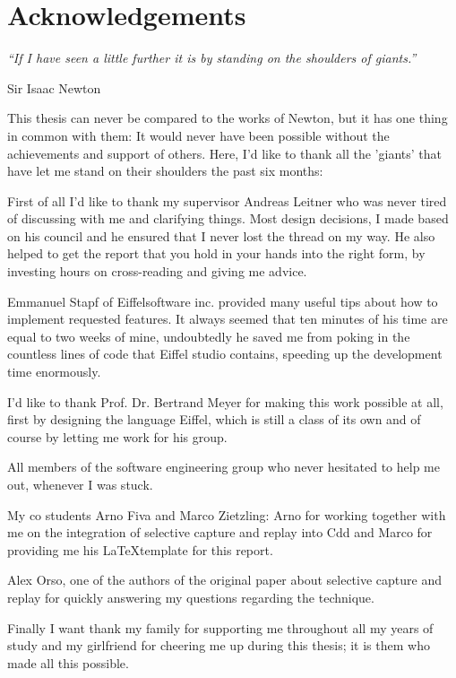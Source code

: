 \chapter*{Acknowledgements}
\begin{center}
 \textit{``If I have seen a little further it is by standing on the shoulders of giants.''}
\end{center}
\begin{flushright}
 Sir Isaac Newton
\end{flushright}

This thesis can never be compared to the works of Newton, but it has one thing in common with them: It would never have been possible without the achievements and support of others. Here, I'd like to thank all the 'giants' that have let me stand on their shoulders the past six months:

First of all I'd like to thank my supervisor Andreas Leitner who was never tired of discussing with me and clarifying things. Most design decisions, I made based on his council and he ensured that I never lost the thread on my way. He also helped to get the report that you hold in your hands into the right form, by investing hours on cross-reading and giving me advice.

Emmanuel Stapf of Eiffelsoftware inc. provided many useful tips about how to implement requested features. It always seemed that ten minutes of his time are equal to two weeks of mine, undoubtedly he saved me from poking in the countless lines of code that Eiffel studio contains, speeding up the development time enormously.

I'd like to thank Prof. Dr. Bertrand Meyer for making this work possible at all, first by designing the language Eiffel, which is still a class of its own and of course by letting me work for his group.

All members of the software engineering group who never hesitated to help me out, whenever I was stuck.

My co students Arno Fiva and Marco Zietzling: Arno for working together with me on the integration of selective capture and replay into Cdd and Marco for providing me his \LaTeX template for this report.

Alex Orso, one of the authors of the original paper about selective capture and replay \cite{orso05may} for quickly answering my questions regarding the technique.

Finally I want thank my family for supporting me throughout all my years of study and my girlfriend for cheering me up during this thesis; it is them who made all this possible.